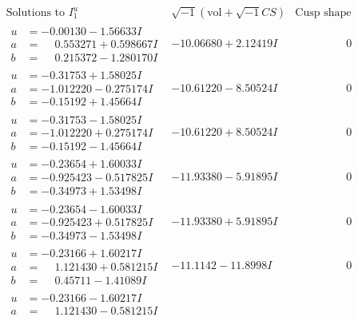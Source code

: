 \documentclass[1p]{elsarticle_modified}
\theoremstyle{definition}
\newcommand{\I}{\sqrt{-1}}
\begin{document}
$$\begin{array}{c|c|c}
\text{Solutions to }I^u_{1}& \I (\text{vol} + \sqrt{-1}CS) & \text{Cusp shape}\\
 \hline 
\begin{aligned}
u &= -0.00130 - 1.56633 I \\
a &= \phantom{-}0.553271 + 0.598667 I \\
b &= \phantom{-}0.215372 - 1.280170 I\end{aligned}
 & -10.06680 + 2.12419 I & \phantom{-0.000000 } 0 \\ \hline\begin{aligned}
u &= -0.31753 + 1.58025 I \\
a &= -1.012220 - 0.275174 I \\
b &= -0.15192 + 1.45664 I\end{aligned}
 & -10.61220 - 8.50524 I & \phantom{-0.000000 } 0 \\ \hline\begin{aligned}
u &= -0.31753 - 1.58025 I \\
a &= -1.012220 + 0.275174 I \\
b &= -0.15192 - 1.45664 I\end{aligned}
 & -10.61220 + 8.50524 I & \phantom{-0.000000 } 0 \\ \hline\begin{aligned}
u &= -0.23654 + 1.60033 I \\
a &= -0.925423 - 0.517825 I \\
b &= -0.34973 + 1.53498 I\end{aligned}
 & -11.93380 - 5.91895 I & \phantom{-0.000000 } 0 \\ \hline\begin{aligned}
u &= -0.23654 - 1.60033 I \\
a &= -0.925423 + 0.517825 I \\
b &= -0.34973 - 1.53498 I\end{aligned}
 & -11.93380 + 5.91895 I & \phantom{-0.000000 } 0 \\ \hline\begin{aligned}
u &= -0.23166 + 1.60217 I \\
a &= \phantom{-}1.121430 + 0.581215 I \\
b &= \phantom{-}0.45711 - 1.41089 I\end{aligned}
 & -11.1142 - 11.8998 I & \phantom{-0.000000 } 0 \\ \hline\begin{aligned}
u &= -0.23166 - 1.60217 I \\
a &= \phantom{-}1.121430 - 0.581215 I \\

\end{aligned}
\end{array}$$
\end{document}
